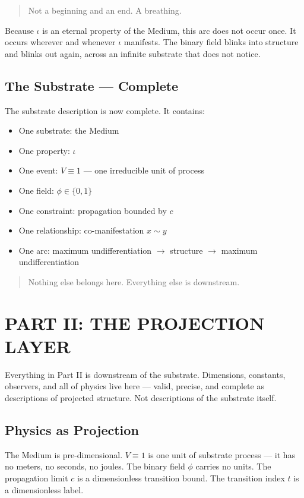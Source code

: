 \documentclass[11pt,letterpaper]{article}
\begin{document}
\begin{quote}
Not a beginning and an end. A breathing.
\end{quote}

Because \(\iota\) is an eternal property of the Medium, this arc does not occur once. It occurs wherever and whenever \(\iota\) manifests. The binary field blinks into structure and blinks out again, across an infinite substrate that does not notice.
\subsection{The Substrate --- Complete}
\label{sec:org970dc8a}

The substrate description is now complete. It contains:

\begin{itemize}
\item One substrate: the Medium
\item One property: \(\iota\)
\item One event: \(V \equiv 1\) --- one irreducible unit of process
\item One field: \(\phi \in \{0, 1\}\)
\item One constraint: propagation bounded by \(c\)
\item One relationship: co-manifestation \(x \sim y\)
\item One arc: maximum undifferentiation \(\to\) structure \(\to\) maximum undifferentiation
\end{itemize}

\begin{quote}
Nothing else belongs here. Everything else is downstream.
\end{quote}
\section{PART II: THE PROJECTION LAYER}
\label{sec:org6e4ee5f}

Everything in Part II is downstream of the substrate. Dimensions, constants, observers, and all of physics live here --- valid, precise, and complete as descriptions of projected structure. Not descriptions of the substrate itself.
\subsection{Physics as Projection}
\label{sec:org16eec01}

The Medium is pre-dimensional. \(V \equiv 1\) is one unit of substrate process --- it has no meters, no seconds, no joules. The binary field \(\phi\) carries no units. The propagation limit \(c\) is a dimensionless transition bound. The transition index \(t\) is a dimensionless label.
\end{document}
